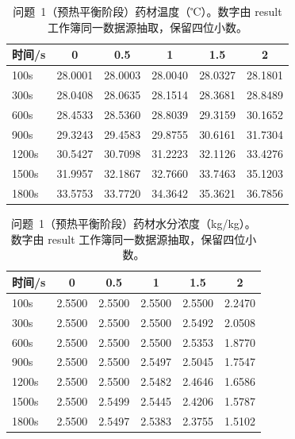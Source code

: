 
\begin{table}[htbp]
\centering
\caption{问题~1（预热平衡阶段）药材温度（℃）。数字由 result 工作簿同一数据源抽取，保留四位小数。}
\label{tab:表1}
\small
\begin{tabular}{lccccc}
\toprule
时间/s & 0 & 0.5 & 1 & 1.5 & 2 \\
\midrule
100s & 28.0001 & 28.0003 & 28.0040 & 28.0327 & 28.1801 \\
300s & 28.0408 & 28.0635 & 28.1514 & 28.3681 & 28.8489 \\
600s & 28.4533 & 28.5360 & 28.8039 & 29.3159 & 30.1652 \\
900s & 29.3243 & 29.4583 & 29.8755 & 30.6161 & 31.7304 \\
1200s & 30.5427 & 30.7098 & 31.2223 & 32.1126 & 33.4276 \\
1500s & 31.9957 & 32.1867 & 32.7660 & 33.7463 & 35.1203 \\
1800s & 33.5753 & 33.7720 & 34.3642 & 35.3621 & 36.7856 \\
\bottomrule
\end{tabular}
\end{table}

\begin{table}[htbp]
\centering
\caption{问题~1（预热平衡阶段）药材水分浓度（kg/kg）。数字由 result 工作簿同一数据源抽取，保留四位小数。}
\label{tab:表2}
\small
\begin{tabular}{lccccc}
\toprule
时间/s & 0 & 0.5 & 1 & 1.5 & 2 \\
\midrule
100s & 2.5500 & 2.5500 & 2.5500 & 2.5500 & 2.2470 \\
300s & 2.5500 & 2.5500 & 2.5500 & 2.5492 & 2.0508 \\
600s & 2.5500 & 2.5500 & 2.5500 & 2.5353 & 1.8770 \\
900s & 2.5500 & 2.5500 & 2.5497 & 2.5045 & 1.7547 \\
1200s & 2.5500 & 2.5500 & 2.5482 & 2.4646 & 1.6586 \\
1500s & 2.5500 & 2.5499 & 2.5445 & 2.4206 & 1.5787 \\
1800s & 2.5500 & 2.5497 & 2.5383 & 2.3755 & 1.5102 \\
\bottomrule
\end{tabular}
\end{table}

